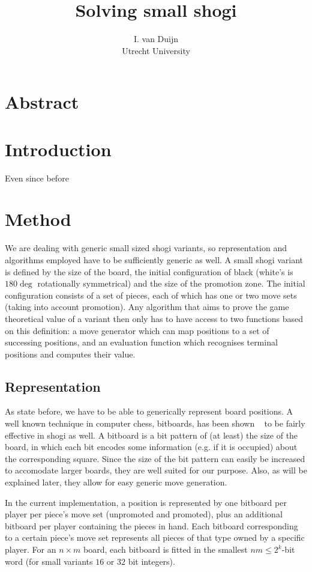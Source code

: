 \documentclass{article}
\title{Solving small shogi}
\author{I. van Duijn \\ Utrecht University}
\begin{document}
\maketitle

\section{Abstract}

\section{Introduction}
Even since before

\section{Method}
We are dealing with generic small sized shogi variants, so representation and algorithms employed have to be sufficiently generic as well.
A small shogi variant is defined by the size of the board, the initial configuration of black (white's is $180\deg$ rotationally symmetrical) and
the size of the promotion zone. The initial configuration consists of a set of pieces, each of which has one or two move sets (taking into account
promotion). Any algorithm that aims to prove the game theoretical value of a variant then only has to have access to two functions based on this
definition: a move generator which can map positions to a set of successing positions, and an evaluation function which recognises terminal
positions and computes their value.

\subsection{Representation}
As state before, we have to be able to generically represent board positions. A well known technique in computer chess, bitboards, has been
shown ~\cite{grimbergen2007using} to be fairly effective in shogi as well. A bitboard is a bit pattern of (at least) the size of the board,
in which each bit encodes some information (e.g. if it is occupied) about the corresponding square. Since the size of the bit pattern can
easily be increased to accomodate larger boards, they are well suited for our purpose. Also, as will be explained later, they allow for easy
generic move generation.

In the current implementation, a position is represented by one bitboard per player per piece's move set (unpromoted and promoted), plus an additional
bitboard per player containing the pieces in hand. Each bitboard corresponding to a certain piece's move set represents all pieces of that type
owned by a specific player. For an $n \times m$ board, each bitboard is fitted in the smallest $nm \leq 2^k$-bit word (for small
variants $16$ or $32$ bit integers). %
\end{document}
